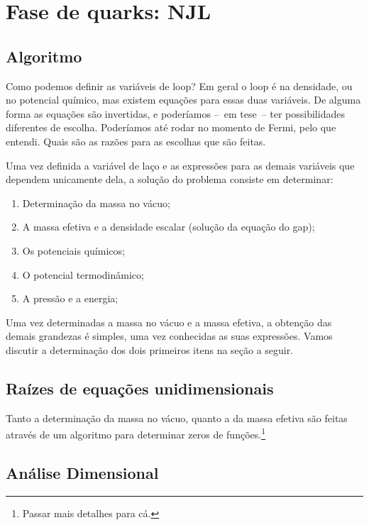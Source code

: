 \section{Fase de quarks: NJL}

\subsection{Algoritmo}

Como podemos definir as variáveis de loop? Em geral o loop é na densidade, ou no potencial químico, mas existem equações para essas duas variáveis. De alguma forma as equações são invertidas, e poderíamos --~em tese~-- ter possibilidades diferentes de escolha. Poderíamos até rodar no momento de Fermi, pelo que entendi. Quais são as razões para as escolhas que são feitas.

Uma vez definida a variável de laço e as expressões para as demais variáveis que dependem unicamente dela, a solução do problema consiste em determinar:
\begin{enumerate}
	\item Determinação da massa no vácuo;
	\item A massa efetiva e a densidade escalar (solução da equação do gap);
	\item Os potenciais químicos;
	\item O potencial termodinâmico;
	\item A pressão e a energia;
\end{enumerate}
%
Uma vez determinadas a massa no vácuo e a massa efetiva, a obtenção das demais grandezas é simples, uma vez conhecidas as suas expressões. Vamos discutir a determinação dos dois primeiros itens na seção a seguir. 

\subsection{Raízes de equações unidimensionais}

Tanto a determinação da massa no vácuo, quanto a da massa efetiva são feitas através de um algoritmo para determinar zeros de funções.\footnote{Passar mais detalhes para cá.}

\subsection{Análise Dimensional}

